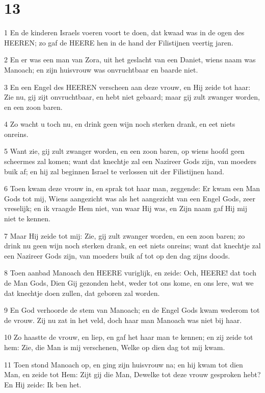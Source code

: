 \chapter{13}

\par 1 En de kinderen Israels voeren voort te doen, dat kwaad was in de ogen des HEEREN; zo gaf de HEERE hen in de hand der Filistijnen veertig jaren.
\par 2 En er was een man van Zora, uit het geslacht van een Daniet, wiens naam was Manoach; en zijn huisvrouw was onvruchtbaar en baarde niet.
\par 3 En een Engel des HEEREN verscheen aan deze vrouw, en Hij zeide tot haar: Zie nu, gij zijt onvruchtbaar, en hebt niet gebaard; maar gij zult zwanger worden, en een zoon baren.
\par 4 Zo wacht u toch nu, en drink geen wijn noch sterken drank, en eet niets onreins.
\par 5 Want zie, gij zult zwanger worden, en een zoon baren, op wiens hoofd geen scheermes zal komen; want dat knechtje zal een Nazireer Gods zijn, van moeders buik af; en hij zal beginnen Israel te verlossen uit der Filistijnen hand.
\par 6 Toen kwam deze vrouw in, en sprak tot haar man, zeggende: Er kwam een Man Gods tot mij, Wiens aangezicht was als het aangezicht van een Engel Gods, zeer vreselijk; en ik vraagde Hem niet, van waar Hij was, en Zijn naam gaf Hij mij niet te kennen.
\par 7 Maar Hij zeide tot mij: Zie, gij zult zwanger worden, en een zoon baren; zo drink nu geen wijn noch sterken drank, en eet niets onreins; want dat knechtje zal een Nazireer Gods zijn, van moeders buik af tot op den dag zijns doods.
\par 8 Toen aanbad Manoach den HEERE vuriglijk, en zeide: Och, HEERE! dat toch de Man Gods, Dien Gij gezonden hebt, weder tot ons kome, en ons lere, wat we dat knechtje doen zullen, dat geboren zal worden.
\par 9 En God verhoorde de stem van Manoach; en de Engel Gods kwam wederom tot de vrouw. Zij nu zat in het veld, doch haar man Manoach was niet bij haar.
\par 10 Zo haastte de vrouw, en liep, en gaf het haar man te kennen; en zij zeide tot hem: Zie, die Man is mij verschenen, Welke op dien dag tot mij kwam.
\par 11 Toen stond Manoach op, en ging zijn huisvrouw na; en hij kwam tot dien Man, en zeide tot Hem: Zijt gij die Man, Dewelke tot deze vrouw gesproken hebt? En Hij zeide: Ik ben het.
